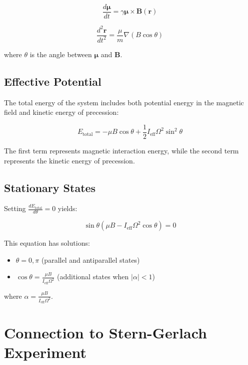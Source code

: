 \documentclass[12pt]{article}
\begin{document}
\begin{equation}
\frac{d\boldsymbol{\mu}}{dt} = \gamma \boldsymbol{\mu} \times \boldsymbol{B}(\boldsymbol{r})
\end{equation}

\begin{equation}
\frac{d^2\boldsymbol{r}}{dt^2} = \frac{\mu}{m} \nabla(B \cos\theta)
\end{equation}

where $\theta$ is the angle between $\boldsymbol{\mu}$ and $\boldsymbol{B}$.

\subsection{Effective Potential}

The total energy of the system includes both potential energy in the magnetic field and kinetic energy of precession:

\begin{equation}
E_{\text{total}} = -\mu B \cos\theta + \frac{1}{2} I_{\text{eff}} \Omega^2 \sin^2\theta
\end{equation}

The first term represents magnetic interaction energy, while the second term represents the kinetic energy of precession.

\subsection{Stationary States}

Setting $\frac{dE_{\text{total}}}{d\theta} = 0$ yields:

\begin{equation}
\sin\theta \left( \mu B - I_{\text{eff}} \Omega^2 \cos\theta \right) = 0
\end{equation}

This equation has solutions:
\begin{itemize}
\item $\theta = 0, \pi$ (parallel and antiparallel states)
\item $\cos\theta = \frac{\mu B}{I_{\text{eff}} \Omega^2}$ (additional states when $|\alpha| < 1$)
\end{itemize}

where $\alpha = \frac{\mu B}{I_{\text{eff}} \Omega^2}$.

\section{Connection to Stern-Gerlach Experiment}
\end{document}
